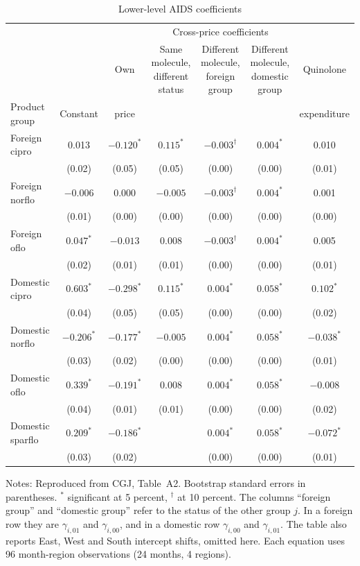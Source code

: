 \begin{table}[htbp]
\centering
\caption{Lower-level AIDS coefficients}\label{tab:05-cgj-tableA2}
\footnotesize
\setlength{\tabcolsep}{3pt}
\begin{tabular}{lcccccc}
\toprule
 & & & \multicolumn{3}{c}{Cross-price coefficients} & \\
\cmidrule(lr){4-6}
 & & Own & \makecell{Same molecule,\\ different status} & \makecell{Different molecule,\\ foreign group} &
 \makecell{Different molecule,\\ domestic group} & Quinolone \\
Product group & Constant & price & & & & expenditure \\
\midrule
Foreign cipro & 0.013 & $-0.120^{*}$ & $0.115^{*}$ & $-0.003^{\dagger}$ & $0.004^{*}$ & 0.010 \\
 & (0.02) & (0.05) & (0.05) & (0.00) & (0.00) & (0.01) \\
Foreign norflo & $-0.006$ & 0.000 & $-0.005$ & $-0.003^{\dagger}$ & $0.004^{*}$ & 0.001 \\
 & (0.01) & (0.00) & (0.00) & (0.00) & (0.00) & (0.00) \\
Foreign oflo & $0.047^{*}$ & $-0.013$ & 0.008 & $-0.003^{\dagger}$ & $0.004^{*}$ & 0.005 \\
 & (0.02) & (0.01) & (0.01) & (0.00) & (0.00) & (0.01) \\
Domestic cipro & $0.603^{*}$ & $-0.298^{*}$ & $0.115^{*}$ & $0.004^{*}$ & $0.058^{*}$ & $0.102^{*}$ \\
 & (0.04) & (0.05) & (0.05) & (0.00) & (0.00) & (0.02) \\
Domestic norflo & $-0.206^{*}$ & $-0.177^{*}$ & $-0.005$ & $0.004^{*}$ & $0.058^{*}$ & $-0.038^{*}$ \\
 & (0.03) & (0.02) & (0.00) & (0.00) & (0.00) & (0.01) \\
Domestic oflo & $0.339^{*}$ & $-0.191^{*}$ & 0.008 & $0.004^{*}$ & $0.058^{*}$ & $-0.008$ \\
 & (0.04) & (0.01) & (0.01) & (0.00) & (0.00) & (0.02) \\
Domestic sparflo & $0.209^{*}$ & $-0.186^{*}$ & & $0.004^{*}$ & $0.058^{*}$ & $-0.072^{*}$ \\
 & (0.03) & (0.02) & & (0.00) & (0.00) & (0.01) \\
\bottomrule
\end{tabular}
\par\smallskip
\begin{minipage}{0.95\textwidth}\footnotesize
Notes: Reproduced from CGJ, Table~A2. Bootstrap standard errors in parentheses. $^{*}$ significant at 5 percent,
$^{\dagger}$ at 10 percent. The columns ``foreign group'' and ``domestic group'' refer to the status of the other
group $j$. In a foreign row they are $\gamma_{i,01}$ and $\gamma_{i,00}$, and in a domestic row $\gamma_{i,00}$ and
$\gamma_{i,01}$. The table also reports East, West and South intercept shifts, omitted here. Each equation uses
96 month-region observations (24 months, 4 regions).
\end{minipage}
\end{table}

